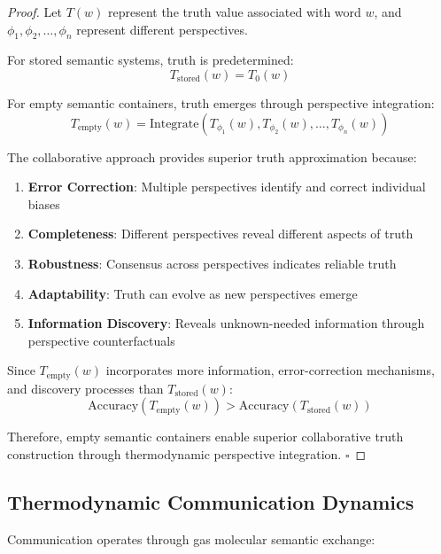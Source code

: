 \documentclass[11pt,a4paper]{article}
\begin{document}
\begin{proof}
Let $T(w)$ represent the truth value associated with word $w$, and $\phi_1, \phi_2, \ldots, \phi_n$ represent different perspectives.

For stored semantic systems, truth is predetermined:
\begin{equation}
T_{\text{stored}}(w) = T_0(w)
\end{equation}

For empty semantic containers, truth emerges through perspective integration:
\begin{equation}
T_{\text{empty}}(w) = \text{Integrate}(T_{\phi_1}(w), T_{\phi_2}(w), \ldots, T_{\phi_n}(w))
\end{equation}

The collaborative approach provides superior truth approximation because:
\begin{enumerate}
\item \textbf{Error Correction}: Multiple perspectives identify and correct individual biases
\item \textbf{Completeness}: Different perspectives reveal different aspects of truth
\item \textbf{Robustness}: Consensus across perspectives indicates reliable truth
\item \textbf{Adaptability}: Truth can evolve as new perspectives emerge
\item \textbf{Information Discovery}: Reveals unknown-needed information through perspective counterfactuals
\end{enumerate}

Since $T_{\text{empty}}(w)$ incorporates more information, error-correction mechanisms, and discovery processes than $T_{\text{stored}}(w)$:
\begin{equation}
\text{Accuracy}(T_{\text{empty}}(w)) > \text{Accuracy}(T_{\text{stored}}(w))
\end{equation}

Therefore, empty semantic containers enable superior collaborative truth construction through thermodynamic perspective integration. $\square$
\end{proof}

\subsection{Thermodynamic Communication Dynamics}

Communication operates through gas molecular semantic exchange:
\end{document}
